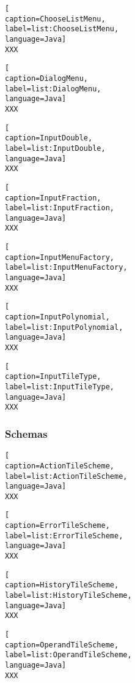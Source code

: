 \begin{lstlisting}[
caption=ChooseListMenu,
label=list:ChooseListMenu,
language=Java]
XXX
\end{lstlisting}    

\begin{lstlisting}[
caption=DialogMenu,
label=list:DialogMenu,
language=Java]
XXX
\end{lstlisting}    

\begin{lstlisting}[
caption=InputDouble,
label=list:InputDouble,
language=Java]
XXX
\end{lstlisting}    

\begin{lstlisting}[
caption=InputFraction,
label=list:InputFraction,
language=Java]
XXX
\end{lstlisting}    

\begin{lstlisting}[
caption=InputMenuFactory,
label=list:InputMenuFactory,
language=Java]
XXX
\end{lstlisting}    

\begin{lstlisting}[
caption=InputPolynomial,
label=list:InputPolynomial,
language=Java]
XXX
\end{lstlisting}    

\begin{lstlisting}[
caption=InputTileType,
label=list:InputTileType,
language=Java]
XXX
\end{lstlisting}    

\subsubsection{Schemas}

\begin{lstlisting}[
caption=ActionTileScheme,
label=list:ActionTileScheme,
language=Java]
XXX
\end{lstlisting}    

\begin{lstlisting}[
caption=ErrorTileScheme,
label=list:ErrorTileScheme,
language=Java]
XXX
\end{lstlisting}    

\begin{lstlisting}[
caption=HistoryTileScheme,
label=list:HistoryTileScheme,
language=Java]
XXX
\end{lstlisting}    

\begin{lstlisting}[
caption=OperandTileScheme,
label=list:OperandTileScheme,
language=Java]
XXX
\end{lstlisting}    

